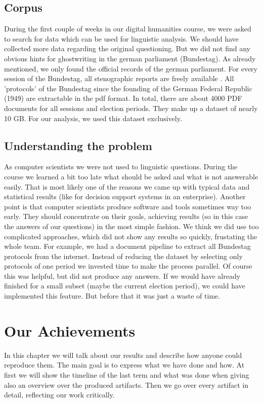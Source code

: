 \documentclass[12pt,paper=a4,nenglish]{scrreprt}
\begin{document}
\section{Corpus}
During the first couple of weeks in our digital humanities course, we were
asked to search for data which can be used for linguistic analysis.
We should have collected more data regarding the original questioning. But we
did not find any obvious hints for ghostwriting in the german
parliament (Bundestag). 
As already mentioned, we only found the official records of the german
parliament.
For every session of the Bundestag, all stenographic reports are freely
available \cite{link_plenarprotokolle}. All 'protocols' of the Bundestag since the founding of the German Federal Republic
(1949) are extractable in the pdf format. In total, there are about 4000 PDF
documents for all sessions and election periods. 
They make up a dataset of nearly 10 GB. 
For our analysis, we used this dataset exclusively. 
\section{Understanding the problem}
\label{sec:understanding_the_problem}
As computer scientists we were not used to linguistic questions.
During the course we learned a bit too late what should be asked and what is
not answerable easily. That is most likely one of the reasons we came up with
typical data and statistical results (like for decision support systems in an enterprise). 
Another point is that computer scientists produce software and tools sometimes
way too early. They should concentrate on their goals, achieving results (so in
this case the answers of our questions) in the most simple fashion. We think we
did use too complicated approaches, which did not show any results so quickly,
frustating the whole team. For example, we had a document pipeline to extract
all Bundestag protocols from the internet. Instead of reducing the dataset by
selecting only protocols of one period we invested time to make the process
parallel. Of course this was  helpful, but did not produce any answers. If we
would have already finished for a small subset (maybe the current
election period), we could have implemented this feature. But
before that it was just a waste of time.

\chapter{Our Achievements}
In this chapter we will talk about our results
and describe how anyone could reproduce them. The main goal is to express what
we have done and how. At first we will show the timeline of the
last term and what was done when giving also an overview over the produced
artifacts.
Then we go over every artifact in detail, reflecting
our work critically. 
\end{document}
